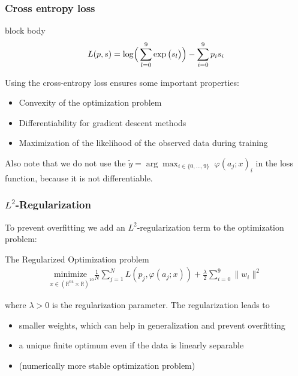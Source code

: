 \documentclass[12pt]{beamer}
\begin{document}
    \begin{frame}
        \frametitle{Cross entropy loss}
        \begin{beamercolorbox}[rounded=false,shadow=false]{block body}
        \begin{align*}
            \vspace{-5cm}
            L(p,s) = \log\!\Big(\sum_{l=0}^{9} \exp\big(s_l\big)\Big) - \sum_{i=0}^{9} p_i s_i
        \end{align*}
        \end{beamercolorbox}
        Using the cross-entropy loss ensures some important properties:
        \begin{itemize}
            \item Convexity of the optimization problem
            \item Differentiability for gradient descent methods
            \item Maximization of the likelihood of the observed data during training
        \end{itemize}

        Also note that we do not use the $\tilde{y} = \arg\max_{i \in \{0,\ldots,9\}}\; \varphi(a_j;x)_i$ in the loss function, because it is not differentiable.    
    \end{frame}
    \begin{frame}
        \frametitle{$L^2$-Regularization}
        To prevent overfitting we add an $L^2$-regularization term to the optimization problem:
        \begin{block}{The Regularized Optimization problem}
        \vspace{-0.5cm}
        \begin{align*}
            \underset{x\in(\mathbb{R}^{64}\times \mathbb{R})^{10}}{\text{minimize }} \frac{1}{N}\sum_{j=1}^N L(p_j,\varphi(a_j;x)) + \frac{\lambda}{2} \sum_{i=0}^{9} \|w_i\|^2
        \end{align*}
        \end{block}
         where $\lambda > 0$ is the regularization parameter.
        The regularization leads to
        \begin{itemize}
            \item smaller weights, which can help in generalization and prevent overfitting
            \item a unique finite optimum even if the data is linearly separable
            \item (numerically more stable optimization problem)
        \end{itemize}
    \end{frame}
\end{document}
